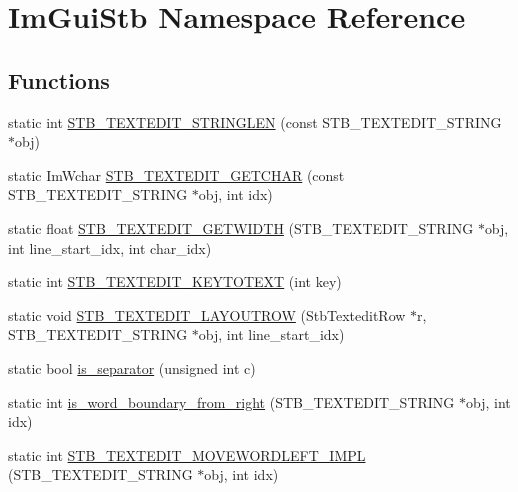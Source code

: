 \hypertarget{namespace_im_gui_stb}{}\section{Im\+Gui\+Stb Namespace Reference}
\label{namespace_im_gui_stb}
\subsection*{Functions}
\begin{DoxyCompactItemize}
\item 
static int \mbox{\hyperlink{namespace_im_gui_stb_a7f0f47a15c18c3348a770c961babeb4b}{S\+T\+B\+\_\+\+T\+E\+X\+T\+E\+D\+I\+T\+\_\+\+S\+T\+R\+I\+N\+G\+L\+EN}} (const S\+T\+B\+\_\+\+T\+E\+X\+T\+E\+D\+I\+T\+\_\+\+S\+T\+R\+I\+NG $\ast$obj)
\item 
static Im\+Wchar \mbox{\hyperlink{namespace_im_gui_stb_a21130c94f2ec487b3c1d4316a1447174}{S\+T\+B\+\_\+\+T\+E\+X\+T\+E\+D\+I\+T\+\_\+\+G\+E\+T\+C\+H\+AR}} (const S\+T\+B\+\_\+\+T\+E\+X\+T\+E\+D\+I\+T\+\_\+\+S\+T\+R\+I\+NG $\ast$obj, int idx)
\item 
static float \mbox{\hyperlink{namespace_im_gui_stb_ad4b4708ebde3dbcf2608a9acfb4550d2}{S\+T\+B\+\_\+\+T\+E\+X\+T\+E\+D\+I\+T\+\_\+\+G\+E\+T\+W\+I\+D\+TH}} (S\+T\+B\+\_\+\+T\+E\+X\+T\+E\+D\+I\+T\+\_\+\+S\+T\+R\+I\+NG $\ast$obj, int line\+\_\+start\+\_\+idx, int char\+\_\+idx)
\item 
static int \mbox{\hyperlink{namespace_im_gui_stb_a41f9ffc3a1e11808194f0984c9b29e25}{S\+T\+B\+\_\+\+T\+E\+X\+T\+E\+D\+I\+T\+\_\+\+K\+E\+Y\+T\+O\+T\+E\+XT}} (int key)
\item 
static void \mbox{\hyperlink{namespace_im_gui_stb_a08ea58387e49ee5ca3cb3ca54b9665f2}{S\+T\+B\+\_\+\+T\+E\+X\+T\+E\+D\+I\+T\+\_\+\+L\+A\+Y\+O\+U\+T\+R\+OW}} (Stb\+Textedit\+Row $\ast$r, S\+T\+B\+\_\+\+T\+E\+X\+T\+E\+D\+I\+T\+\_\+\+S\+T\+R\+I\+NG $\ast$obj, int line\+\_\+start\+\_\+idx)
\item 
static bool \mbox{\hyperlink{namespace_im_gui_stb_ada7de5d22e36a0bb17592c27dbafc02d}{is\+\_\+separator}} (unsigned int c)
\item 
static int \mbox{\hyperlink{namespace_im_gui_stb_a4e3d14415639a57b7d77dfedfa91b8f7}{is\+\_\+word\+\_\+boundary\+\_\+from\+\_\+right}} (S\+T\+B\+\_\+\+T\+E\+X\+T\+E\+D\+I\+T\+\_\+\+S\+T\+R\+I\+NG $\ast$obj, int idx)
\item 
static int \mbox{\hyperlink{namespace_im_gui_stb_a1303c5ec27b283a238b7129f564f3e17}{S\+T\+B\+\_\+\+T\+E\+X\+T\+E\+D\+I\+T\+\_\+\+M\+O\+V\+E\+W\+O\+R\+D\+L\+E\+F\+T\+\_\+\+I\+M\+PL}} (S\+T\+B\+\_\+\+T\+E\+X\+T\+E\+D\+I\+T\+\_\+\+S\+T\+R\+I\+NG $\ast$obj, int idx)

\end{DoxyCompactItemize}
